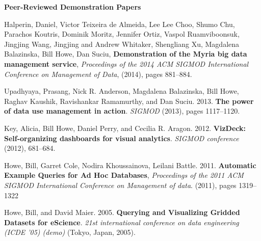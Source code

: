 {\bf Peer-Reviewed Demonstration Papers}
\begin{bulletlist}

\item Halperin, Daniel, Victor Teixeira de Almeida, Lee Lee Choo, Shumo Chu, 
Parachos Koutris, Dominik Moritz, Jennifer Ortiz, Vaspol Ruamviboonsuk, Jingjing Wang, 
Jingjing and Andrew Whitaker, Shengliang Xu, Magdalena Balazinska, Bill Howe, Dan Suciu, 
\textbf{Demonstration of the Myria big data management service},
\emph{Proceedings of the 2014 ACM SIGMOD International Conference on Management of Data},
(2014), pages 881--884.

\item Upadhyaya, Prasang, Nick R. Anderson, Magdalena Balazinska, Bill
Howe, Raghav Kaushik, Ravishankar Ramamurthy, and Dan Suciu. 2013. 
\textbf{The power of data use management in action}. \emph{SIGMOD} (2013),
pages 1117--1120. 

\item Key, Alicia, Bill Howe, Daniel
Perry, and Cecilia R. Aragon. 2012. 
\textbf{VizDeck: Self-organizing dashboards for visual analytics}. 
\emph{SIGMOD conference} (2012), 681--684.

\item Howe, Bill, Garret Cole, Nodira Khoussainova, Leilani Battle. 2011.
\textbf{Automatic Example Queries for Ad Hoc Databases},
\emph{Proceedings of the 2011 ACM SIGMOD International Conference on Management of data}. (2011), pages 1319--1322

\item Howe, Bill, and David Maier. 2005. 
\textbf{Querying and Visualizing Gridded Datasets for eScience}. \emph{21st international conference on
data engineering (ICDE '05) (demo)} (Tokyo, Japan, 2005). 

\end{bulletlist}


